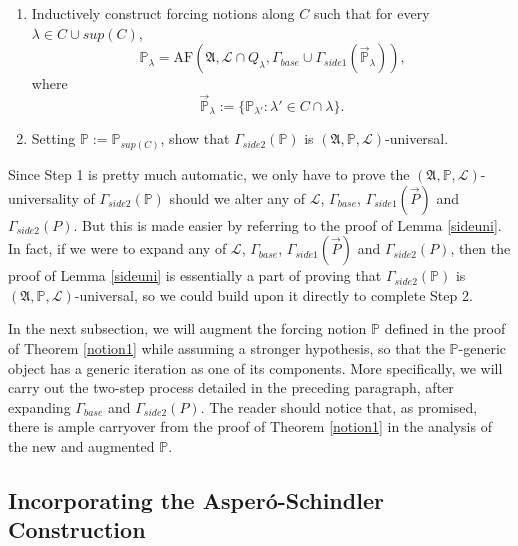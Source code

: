 \documentclass[12pt]{article}
\numberwithin{equation}{section}
\begin{document}
\begin{enumerate}[leftmargin=50pt, label=Step \arabic*:]
    \item\label{remstep1} Inductively construct forcing notions along $C$ such that for every $\lambda \in C \cup sup(C)$, $$\mathbb{P}_{\lambda} = \mathrm{AF}(\mathfrak{A}, \mathcal{L} \cap Q_{\lambda}, \Gamma_{base} \cup \Gamma_{side1}(\Vec{\mathbb{P}}_{\lambda})) \text{,}$$ where $$\Vec{\mathbb{P}}_{\lambda} := \{\mathbb{P}_{\lambda'} : \lambda' \in C \cap \lambda\} \text{.}$$
    \item Setting $\mathbb{P} := \mathbb{P}_{sup(C)}$, show that $\Gamma_{side2}(\mathbb{P})$ is $(\mathfrak{A}, \mathbb{P}, \mathcal{L})$-universal.
\end{enumerate}
Since Step 1 is pretty much automatic, we only have to prove the $(\mathfrak{A}, \mathbb{P}, \mathcal{L})$-universality of $\Gamma_{side2}(\mathbb{P})$ should we alter any of $\mathcal{L}$, $\Gamma_{base}$, $\Gamma_{side1}(\Vec{P})$ and $\Gamma_{side2}(P)$. But this is made easier by referring to the proof of Lemma \ref{sideuni}. In fact, if we were to expand any of $\mathcal{L}$, $\Gamma_{base}$, $\Gamma_{side1}(\Vec{P})$ and $\Gamma_{side2}(P)$, then the proof of Lemma \ref{sideuni} is essentially a part of proving that $\Gamma_{side2}(\mathbb{P})$ is $(\mathfrak{A}, \mathbb{P}, \mathcal{L})$-universal, so we could build upon it directly to complete Step 2. 

In the next subsection, we will augment the forcing notion $\mathbb{P}$ defined in the proof of Theorem \ref{notion1} while assuming a stronger hypothesis, so that the $\mathbb{P}$-generic object has a generic iteration as one of its components. More specifically, we will carry out the two-step process detailed in the preceding paragraph, after expanding $\Gamma_{base}$ and $\Gamma_{side2}(P)$. The reader should notice that, as promised, there is ample carryover from the proof of Theorem \ref{notion1} in the analysis of the new and augmented $\mathbb{P}$.

\subsection{Incorporating the Asper\'{o}-Schindler Construction}\label{ss43}
\end{document}

